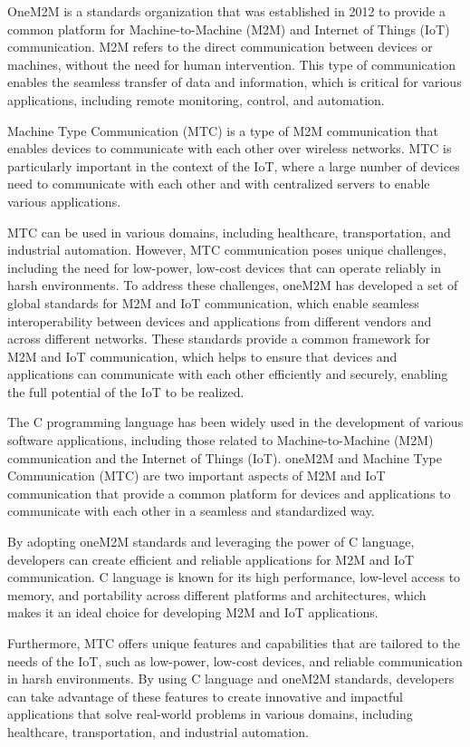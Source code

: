 \documentclass[a4paper,fleqn]{cas-dc}
\begin{document}
OneM2M is a standards organization that was established in 2012 to provide a common platform for Machine-to-Machine (M2M) and Internet of Things (IoT) communication. M2M refers to the direct communication between devices or machines, without the need for human intervention. This type of communication enables the seamless transfer of data and information, which is critical for various applications, including remote monitoring, control, and automation.

Machine Type Communication (MTC) is a type of M2M communication that enables devices to communicate with each other over wireless networks. MTC is particularly important in the context of the IoT, where a large number of devices need to communicate with each other and with centralized servers to enable various applications.

MTC can be used in various domains, including healthcare, transportation, and industrial automation. However, MTC communication poses unique challenges, including the need for low-power, low-cost devices that can operate reliably in harsh environments. To address these challenges, oneM2M has developed a set of global standards for M2M and IoT communication, which enable seamless interoperability between devices and applications from different vendors and across different networks. These standards provide a common framework for M2M and IoT communication, which helps to ensure that devices and applications can communicate with each other efficiently and securely, enabling the full potential of the IoT to be realized.

The C programming language has been widely used in the development of various software applications, including those related to Machine-to-Machine (M2M) communication and the Internet of Things (IoT). oneM2M and Machine Type Communication (MTC) are two important aspects of M2M and IoT communication that provide a common platform for devices and applications to communicate with each other in a seamless and standardized way.

By adopting oneM2M standards and leveraging the power of C language, developers can create efficient and reliable applications for M2M and IoT communication. C language is known for its high performance, low-level access to memory, and portability across different platforms and architectures, which makes it an ideal choice for developing M2M and IoT applications.

Furthermore, MTC offers unique features and capabilities that are tailored to the needs of the IoT, such as low-power, low-cost devices, and reliable communication in harsh environments. By using C language and oneM2M standards, developers can take advantage of these features to create innovative and impactful applications that solve real-world problems in various domains, including healthcare, transportation, and industrial automation.
\end{document}
